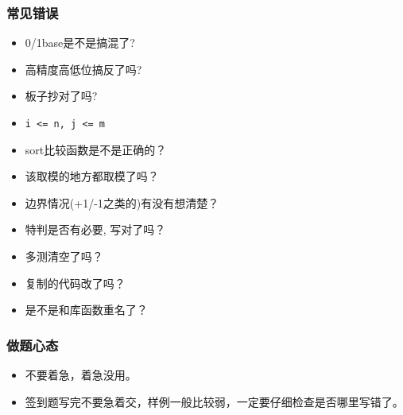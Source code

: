 \documentclass[a4paper, twoside]{article}
\begin{document}
        \subsubsection{常见错误}
        \begin{itemize}
            \item 0/1base是不是搞混了?
            \item 高精度高低位搞反了吗?
            \item 板子抄对了吗?
            \item \texttt{i <= n, j <= m}
            \item sort比较函数是不是正确的？
            \item 该取模的地方都取模了吗？
            \item 边界情况(+1/-1之类的)有没有想清楚？
            \item 特判是否有必要, 写对了吗？
            \item 多测清空了吗？
            \item 复制的代码改了吗？
            \item 是不是和库函数重名了？
        \end{itemize}

        \subsubsection{做题心态}
        \begin{itemize}
            \item 不要着急，着急没用。
            \item 签到题写完不要急着交，样例一般比较弱，一定要仔细检查是否哪里写错了。
        \end{itemize}
    
    \newpage
\end{document}
